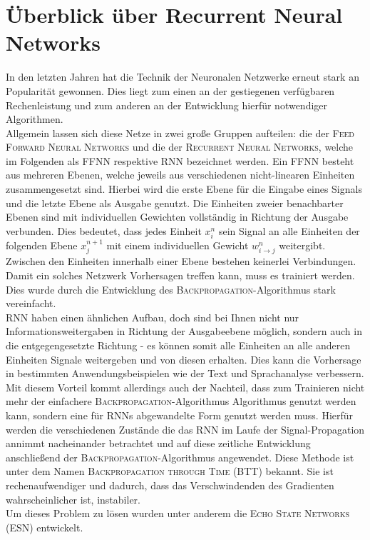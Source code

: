 \chapter{Überblick über Recurrent Neural Networks}
In den letzten Jahren hat die Technik der Neuronalen Netzwerke erneut stark an Popularität gewonnen. Dies liegt zum einen an der gestiegenen verfügbaren Rechenleistung und zum anderen an der Entwicklung hierfür notwendiger Algorithmen.\\
Allgemein lassen sich diese Netze in zwei große Gruppen aufteilen: die der \textsc{Feed Forward Neural Networks} und die der \textsc{Recurrent Neural Networks}, welche im Folgenden als \textsc{FFNN} respektive \textsc{RNN} bezeichnet werden.
Ein \textsc{FFNN} besteht aus mehreren Ebenen, welche jeweils aus verschiedenen nicht-linearen Einheiten zusammengesetzt sind. Hierbei wird die erste Ebene für die Eingabe eines Signals und die letzte Ebene als Ausgabe genutzt. Die Einheiten zweier benachbarter Ebenen sind mit individuellen Gewichten vollständig in Richtung der Ausgabe verbunden. Dies bedeutet, dass jedes Einheit $x^n_i$ sein Signal an alle Einheiten der folgenden Ebene $x^{n+1}_j$ mit einem individuellen Gewicht $w^n_{i \rightarrow j}$ weitergibt. Zwischen den Einheiten innerhalb einer Ebene bestehen keinerlei Verbindungen.
Damit ein solches Netzwerk Vorhersagen treffen kann, muss es trainiert werden. Dies wurde durch die Entwicklung des \textsc{Backpropagation}-Algorithmus stark vereinfacht.\\

\textsc{RNN} haben einen ähnlichen Aufbau, doch sind bei Ihnen nicht nur Informationsweitergaben in Richtung der Ausgabeebene möglich, sondern auch in die entgegengesetzte Richtung - es können somit alle Einheiten an alle anderen Einheiten Signale weitergeben und von diesen erhalten. Dies kann die Vorhersage in bestimmten Anwendungsbeispielen wie der Text und Sprachanalyse verbessern. Mit diesem Vorteil kommt allerdings auch der Nachteil, dass zum Trainieren nicht mehr der einfachere \textsc{Backpropagation}-Algorithmus Algorithmus genutzt werden kann, sondern eine für \textsc{RNN}s abgewandelte Form genutzt werden muss. Hierfür werden die verschiedenen Zustände die das \textsc{RNN} im Laufe der Signal-Propagation annimmt nacheinander betrachtet und auf diese zeitliche Entwicklung anschließend der \textsc{Backpropagation}-Algorithmus angewendet. Diese Methode ist unter dem Namen \textsc{Backpropagation through Time} (BTT) bekannt. Sie ist rechenaufwendiger und dadurch, dass das Verschwindenden des Gradienten wahrscheinlicher ist, instabiler.\\

Um dieses Problem zu lösen wurden unter anderem die \textsc{Echo State Networks} (ESN) entwickelt.

